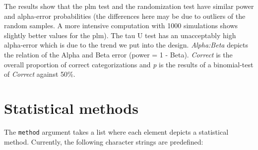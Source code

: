 \documentclass[
]{book}
\begin{document}
The results show that the plm test and the randomization test have similar power and alpha-error probabilities (the differences here may be due to outliers of the random samples. A more intensive computation with 1000 simulations shows slightly better values for the plm). The tau U test has an unacceptably high alpha-error which is due to the trend we put into the design. \emph{Alpha:Beta} depicts the relation of the Alpha and Beta error (power = 1 - Beta). \emph{Correct} is the overall proportion of correct categorizations and \emph{p} is the results of a binomial-test of \emph{Correct} against 50\%.

\hypertarget{statistical-methods}{%
\section{Statistical methods}\label{statistical-methods}}

The \texttt{method} argument takes a list where each element depicts a statistical method. Currently, the following character strings are predefined:
\end{document}
